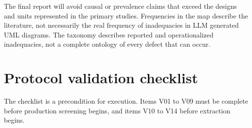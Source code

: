 The final report will avoid causal or prevalence claims that exceed the designs and units represented in the primary studies. Frequencies in the map describe the literature, not necessarily the real frequency of inadequacies in LLM generated UML diagrams. The taxonomy describes reported and operationalized inadequacies, not a complete ontology of every defect that can occur.

\section{Protocol validation checklist}
\label{sec:protocol_checklist}

The checklist is a precondition for execution. Items V01 to V09 must be complete before production screening begins, and items V10 to V14 before extraction begins.

